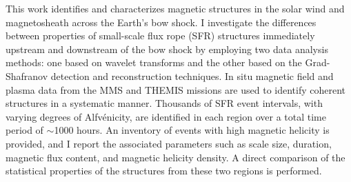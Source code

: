 This work identifies and characterizes magnetic structures in the solar wind and magnetosheath across the Earth's bow shock. I investigate the differences between properties of small-scale flux rope (SFR) structures immediately upstream and downstream of the bow shock by employing two data analysis methods: one based on wavelet transforms and the other based on the Grad-Shafranov detection and reconstruction techniques. In situ magnetic field and plasma data from the MMS and THEMIS missions are used to identify coherent structures in a systematic manner. Thousands of SFR event intervals, with varying degrees of Alfv\'enicity, are identified in each region over a total time period of $\sim$1000 hours. An inventory of events with high magnetic helicity is provided, and I report the associated parameters such as scale size, duration, magnetic flux content, and magnetic helicity density. A direct comparison of the statistical properties of the structures from these two regions is performed.



\clearpage

